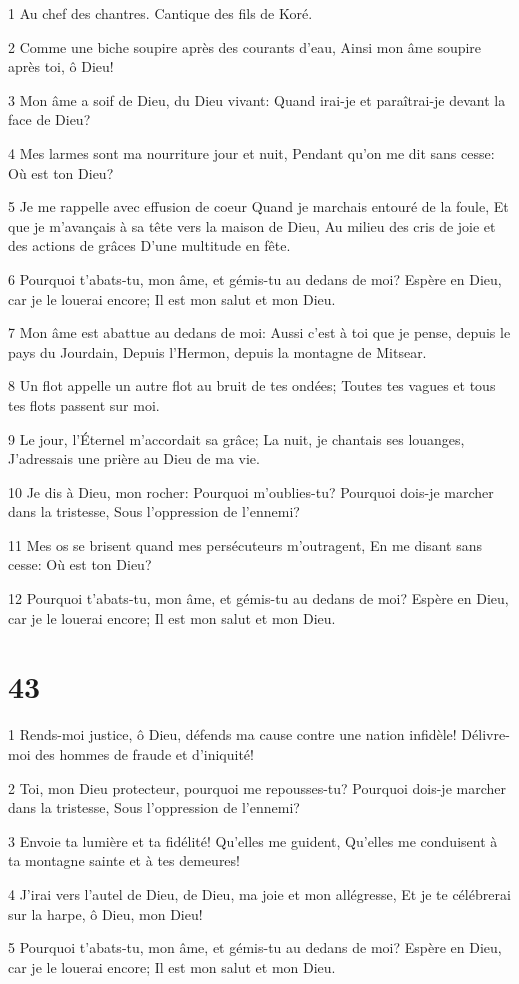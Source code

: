 \par 1 Au chef des chantres. Cantique des fils de Koré.
\par 2 Comme une biche soupire après des courants d'eau, Ainsi mon âme soupire après toi, ô Dieu!
\par 3 Mon âme a soif de Dieu, du Dieu vivant: Quand irai-je et paraîtrai-je devant la face de Dieu?
\par 4 Mes larmes sont ma nourriture jour et nuit, Pendant qu'on me dit sans cesse: Où est ton Dieu?
\par 5 Je me rappelle avec effusion de coeur Quand je marchais entouré de la foule, Et que je m'avançais à sa tête vers la maison de Dieu, Au milieu des cris de joie et des actions de grâces D'une multitude en fête.
\par 6 Pourquoi t'abats-tu, mon âme, et gémis-tu au dedans de moi? Espère en Dieu, car je le louerai encore; Il est mon salut et mon Dieu.
\par 7 Mon âme est abattue au dedans de moi: Aussi c'est à toi que je pense, depuis le pays du Jourdain, Depuis l'Hermon, depuis la montagne de Mitsear.
\par 8 Un flot appelle un autre flot au bruit de tes ondées; Toutes tes vagues et tous tes flots passent sur moi.
\par 9 Le jour, l'Éternel m'accordait sa grâce; La nuit, je chantais ses louanges, J'adressais une prière au Dieu de ma vie.
\par 10 Je dis à Dieu, mon rocher: Pourquoi m'oublies-tu? Pourquoi dois-je marcher dans la tristesse, Sous l'oppression de l'ennemi?
\par 11 Mes os se brisent quand mes persécuteurs m'outragent, En me disant sans cesse: Où est ton Dieu?
\par 12 Pourquoi t'abats-tu, mon âme, et gémis-tu au dedans de moi? Espère en Dieu, car je le louerai encore; Il est mon salut et mon Dieu.

\chapter{43}

\par 1 Rends-moi justice, ô Dieu, défends ma cause contre une nation infidèle! Délivre-moi des hommes de fraude et d'iniquité!
\par 2 Toi, mon Dieu protecteur, pourquoi me repousses-tu? Pourquoi dois-je marcher dans la tristesse, Sous l'oppression de l'ennemi?
\par 3 Envoie ta lumière et ta fidélité! Qu'elles me guident, Qu'elles me conduisent à ta montagne sainte et à tes demeures!
\par 4 J'irai vers l'autel de Dieu, de Dieu, ma joie et mon allégresse, Et je te célébrerai sur la harpe, ô Dieu, mon Dieu!
\par 5 Pourquoi t'abats-tu, mon âme, et gémis-tu au dedans de moi? Espère en Dieu, car je le louerai encore; Il est mon salut et mon Dieu.

